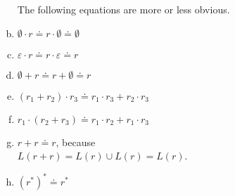 \begin{enumerate}[(a)]
      The following equations are more or less obvious.
\item $\emptyset \cdot r \doteq r \cdot \emptyset \doteq \emptyset$
\item $\varepsilon \cdot r \doteq r \cdot \varepsilon \doteq r$
\item $\emptyset + r \doteq r + \emptyset \doteq r$
\item $(r_1 + r_2) \cdot r_3 \doteq r_1 \cdot r_3 + r_2 \cdot r_3$
\item $r_1 \cdot (r_2 + r_3) \doteq r_1 \cdot r_2 + r_1 \cdot r_3$
\item $r + r \doteq r$, because
      \\[0.2cm]
      \hspace*{1.3cm}
      $L(r+r) = L(r) \cup L(r) = L(r)$.
\item $(r^*)^* \doteq r^*$      


\end{enumerate}
